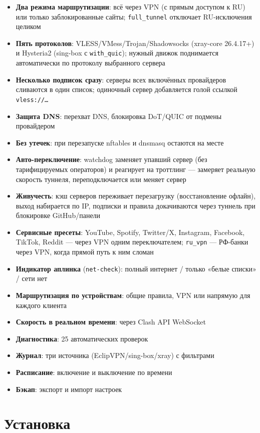 \documentclass[11pt,a4paper]{article}
\begin{document}
\begin{itemize}
\item \textbf{Два режима маршрутизации}: всё через VPN (с прямым доступом к RU) или только заблокированные сайты; \texttt{full\_tunnel} отключает RU-исключения целиком
\item \textbf{Пять протоколов}: VLESS/VMess/Trojan/Shadowsocks (xray-core 26.4.17+) и Hysteria2 (sing-box с \texttt{with\_quic}); нужный движок поднимается автоматически по протоколу выбранного сервера
\item \textbf{Несколько подписок сразу}: серверы всех включённых провайдеров сливаются в один список; одиночный сервер добавляется голой ссылкой \texttt{vless://…}
\item \textbf{Защита DNS}: перехват DNS, блокировка DoT/QUIC от подмены провайдером
\item \textbf{Без утечек}: при перезапуске nftables и dnsmasq остаются на месте
\item \textbf{Авто-переключение}: watchdog заменяет упавший сервер (без тарифицируемых операторов) и реагирует на троттлинг — замеряет реальную скорость туннеля, переподключается или меняет сервер
\item \textbf{Живучесть}: кэш серверов переживает перезагрузку (восстановление офлайн), выход набирается по IP, подписки и правила докачиваются через туннель при блокировке GitHub/панели
\item \textbf{Сервисные пресеты}: YouTube, Spotify, Twitter/X, Instagram, Facebook, TikTok, Reddit — через VPN одним переключателем; \texttt{ru\_vpn} — РФ-банки через VPN, когда прямой путь к ним сломан
\item \textbf{Индикатор аплинка} (\texttt{net-check}): полный интернет / только «белые списки» / сети нет
\item \textbf{Маршрутизация по устройствам}: общие правила, VPN или напрямую для каждого клиента
\item \textbf{Скорость в реальном времени}: через Clash API WebSocket
\item \textbf{Диагностика}: 25 автоматических проверок
\item \textbf{Журнал}: три источника (EclipVPN/sing-box/xray) с фильтрами
\item \textbf{Расписание}: включение и выключение по времени
\item \textbf{Бэкап}: экспорт и импорт настроек
\end{itemize}

\section{Установка}
\end{document}
